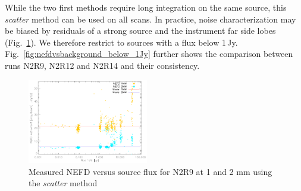 While the two first methods require long integration on the same source, this
\emph{scatter} method can be used on all scans. In practice, noise
characterization may be biased by residuals of a strong source and the
instrument far side lobes (Fig.~\ref{fig:nefdvsbackground}). We therefore
restrict to sources with a flux below
1\,Jy. Fig.~\ref{fig:nefdvsbackground_below_1Jy} further shows the comparison
between runs N2R9, N2R12 and N2R14 and their consistency.

\begin{figure}[!thbp]
\begin{center}
\includegraphics[clip=true,width=0.47\textwidth]{Figures/NEFDIndScans/nefd_flux1mm_run22.pdf}
\caption[Measured NEFD versus source flux for N2R9 at 1 and 2 mm]{Measured NEFD
  versus source flux for N2R9 at 1 and 2 mm using the \emph{scatter} method}
\label{fig:nefdvsbackground}
\end{center}
\end{figure}

